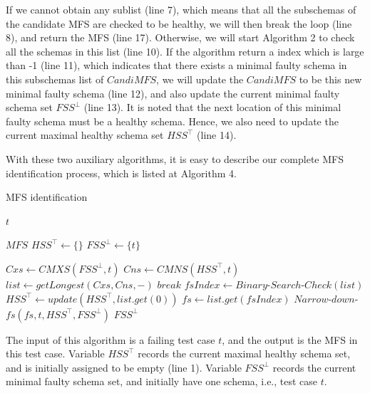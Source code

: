 \documentclass{sig-alternate-05-2015}
\begin{document}
{If we cannot obtain any sublist (line 7), which means that all the subschemas of the candidate MFS are checked to be healthy, we will then break the loop (line 8), and return the MFS (line 17). Otherwise, we will start Algorithm 2 to check all the schemas in this list (line 10). If the algorithm return a index which is large than -1 (line 11), which indicates that there exists a minimal faulty schema in this subschemas list of $CandiMFS$, we will update the $CandiMFS$ to be this new minimal faulty schema (line 12), and also update the current minimal faulty schema set $FSS^{\bot}$ (line 13). It is noted that the next location of this minimal faulty schema must be a healthy schema. Hence, we also need to  update the current maximal healthy schema set $HSS^{\top}$ (line 14).

With these two auxiliary algorithms, it is easy to describe our complete MFS identification process, which is listed at Algorithm 4.

\begin{algorithm}[!htb]
  \caption{MFS identification}
  \begin{algorithmic}[1]
     \Require  $t$ 

    \Ensure  $MFS$ 
    \State $HSS^{\top} \leftarrow \{\}$
    \State $FSS^{\bot} \leftarrow \{ t \} $


        \State $Cxs \leftarrow CMXS(FSS^{\bot}, t) $
        \State $Cns \leftarrow CMNS(HSS^{\top}, t) $
        \State $list \leftarrow getLongest(Cxs, Cns, -) $
            \State $break$
        \EndIf
        \State $fsIndex \leftarrow Binary$-$Search$-$Check(list)$
            \State $HSS^{\top} \leftarrow update(HSS^{\top}, list.get(0))$
        \Else
            \State $fs \leftarrow list.get(fsIndex)$
            \State $Narrow$-$down$-$fs(fs, t, HSS^{\top}, FSS^{\bot} )$
        \EndIf
    \EndWhile
     \State \Return $FSS^{\bot}$
  \end{algorithmic}
\end{algorithm}


The input of this algorithm is a failing test case $t$, and the output is the MFS in this test case. Variable $HSS^{\top}$ records the current maximal healthy schema set, and is initially assigned to be empty (line 1). Variable $FSS^{\bot}$ records the current minimal faulty schema set, and initially have one schema, i.e., test case $t$.

}
\end{document}
